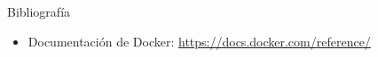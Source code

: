 \begin{frame}{Bibliografía}
\begin{itemize}
    \item Documentación de Docker: \href{https://docs.docker.com/reference/}{https://docs.docker.com/reference/}
\end{itemize}
\end{frame}
